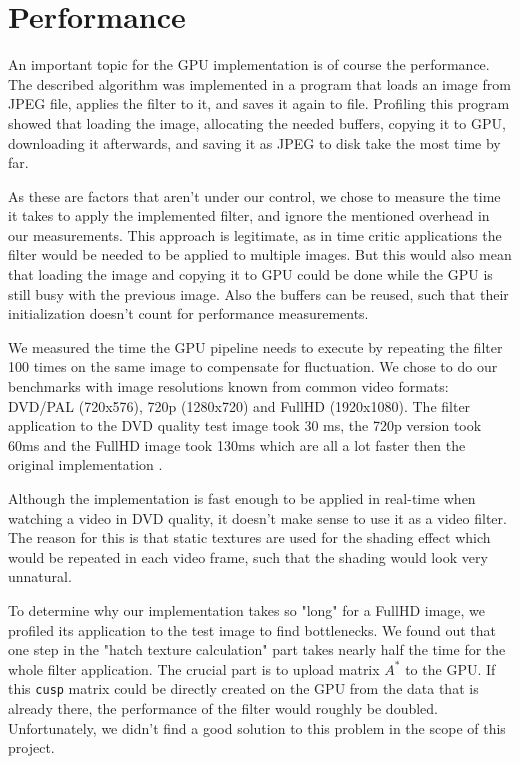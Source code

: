 \section{Performance} \label{performance}
An important topic for the GPU implementation is of course the performance.
The described algorithm was implemented in a program that loads an image
from JPEG file, applies the filter to it, and saves it again to file.
Profiling this program showed that loading the image, allocating the
needed buffers, copying it to GPU, downloading it afterwards, and saving it
as JPEG to disk take the most time by far.

As these are factors that aren't under our control, we chose to measure
the time it takes to apply the implemented filter, and ignore the mentioned
overhead in our measurements. This approach is legitimate, as in time critic
applications the filter would be needed to be applied to multiple images. But this
would also mean that loading the image and copying it to GPU could be done while
the GPU is still busy with the previous image. Also the buffers can be reused,
such that their initialization doesn't count for performance measurements.

We measured the time the GPU pipeline needs to execute by repeating the
filter 100 times on the same image to compensate for fluctuation. We chose to do
our benchmarks with image resolutions known from common video formats:
DVD/PAL (720x576), 720p (1280x720) and FullHD (1920x1080). The filter
application to the DVD quality test image took 30 ms, the 720p version
took 60ms and the FullHD image took 130ms which are all a lot faster
then the original implementation \cite{mainPaper}.

Although the implementation is fast enough to be applied in real-time when watching
a video in DVD quality, it doesn't make sense to use it as a video filter.
The reason for this is that static textures are used for the shading effect
which would be repeated in each video frame, such that the shading would look
very unnatural.

To determine why our implementation takes so "long" for a FullHD image,
we profiled its application to the test image to find bottlenecks. We found out
that one step in the "hatch texture calculation" part takes nearly half the
time for the whole filter application. The crucial part is to upload matrix
$A^*$ to the GPU. If this \texttt{cusp} matrix could be directly created on the
GPU from the data that is already there, the performance of the filter would
roughly be doubled.  Unfortunately, we didn't find a good solution to this problem
in the scope of this project.
